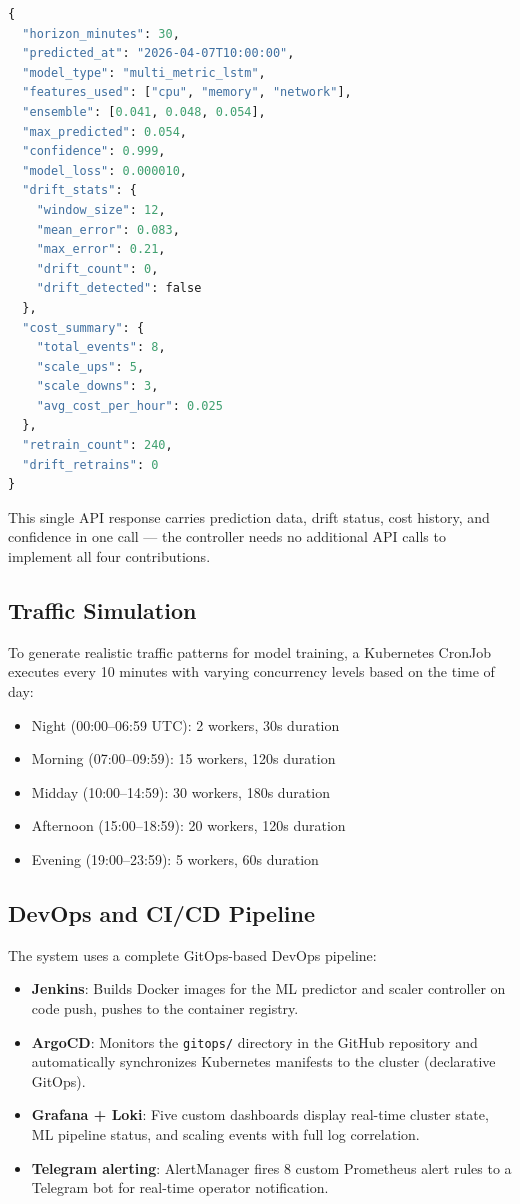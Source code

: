 \documentclass[journal]{IEEEtran}
\begin{document}
\begin{lstlisting}[language=Python,caption={/predict endpoint response (v2)}]
{
  "horizon_minutes": 30,
  "predicted_at": "2026-04-07T10:00:00",
  "model_type": "multi_metric_lstm",
  "features_used": ["cpu", "memory", "network"],
  "ensemble": [0.041, 0.048, 0.054],
  "max_predicted": 0.054,
  "confidence": 0.999,
  "model_loss": 0.000010,
  "drift_stats": {
    "window_size": 12,
    "mean_error": 0.083,
    "max_error": 0.21,
    "drift_count": 0,
    "drift_detected": false
  },
  "cost_summary": {
    "total_events": 8,
    "scale_ups": 5,
    "scale_downs": 3,
    "avg_cost_per_hour": 0.025
  },
  "retrain_count": 240,
  "drift_retrains": 0
}
\end{lstlisting}

This single API response carries prediction data, drift status, cost history, and confidence in one call --- the controller needs no additional API calls to implement all four contributions.

\subsection{Traffic Simulation}
To generate realistic traffic patterns for model training, a Kubernetes CronJob executes every 10 minutes with varying concurrency levels based on the time of day:

\begin{itemize}
    \item Night (00:00--06:59 UTC): 2 workers, 30s duration
    \item Morning (07:00--09:59): 15 workers, 120s duration
    \item Midday (10:00--14:59): 30 workers, 180s duration
    \item Afternoon (15:00--18:59): 20 workers, 120s duration
    \item Evening (19:00--23:59): 5 workers, 60s duration
\end{itemize}

\subsection{DevOps and CI/CD Pipeline}
The system uses a complete GitOps-based DevOps pipeline:
\begin{itemize}
    \item \textbf{Jenkins}: Builds Docker images for the ML predictor and scaler controller on code push, pushes to the container registry.
    \item \textbf{ArgoCD}: Monitors the \texttt{gitops/} directory in the GitHub repository and automatically synchronizes Kubernetes manifests to the cluster (declarative GitOps).
    \item \textbf{Grafana + Loki}: Five custom dashboards display real-time cluster state, ML pipeline status, and scaling events with full log correlation.
    \item \textbf{Telegram alerting}: AlertManager fires 8 custom Prometheus alert rules to a Telegram bot for real-time operator notification.
\end{itemize}
\end{document}
